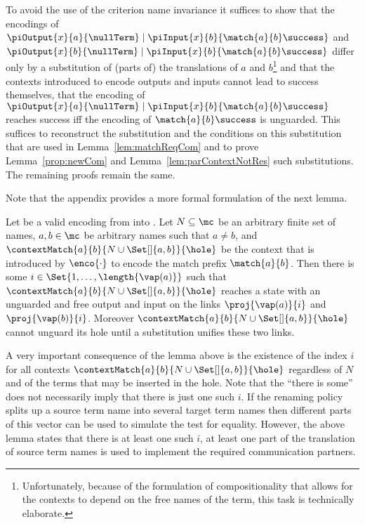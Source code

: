 \documentclass[final,copyright,creativecommons]{eptcs}
\begin{document}
To avoid the use of the criterion name invariance it suffices to show that the encodings of $ \piOutput{x}{a}{\nullTerm} \mid \piInput{x}{b}{\match{a}{b}\success} $ and $ \piOutput{x}{b}{\nullTerm} \mid \piInput{x}{b}{\match{a}{b}\success} $ differ only by a substitution of (parts of) the translations of $ a $ and $ b $\footnote{Unfortunately, because of the formulation of compositionality that allows for the contexts to depend on the free names of the term, this task is technically elaborate.} and that the contexts introduced to encode outputs and inputs cannot lead to success themselves, \ie that the encoding of $ \piOutput{x}{a}{\nullTerm} \mid \piInput{x}{b}{\match{a}{b}\success} $ reaches success iff the encoding of $ \match{a}{b}\success $ is unguarded. This suffices to reconstruct the substitution and the conditions on this substitution that are used in Lemma~\ref{lem:matchReqCom} and to prove Lemma~\ref{prop:newCom} and Lemma~\ref{lem:parContextNotRes} \wrt such substitutions. The remaining proofs remain the same.

Note that the appendix provides a more formal formulation of the next lemma.

\begin{lemma}
	\label{lem:matchReqCom}
	Let \encod be a valid encoding from \piT into \piNM.
	Let $ N \subseteq \mc $ be an arbitrary finite set of names,
	$ a, b \in \mc $ be arbitrary names such that $ a \neq b $,
	and $ \contextMatch{a}{b}{N \cup \Set[]{ a, b }}{\hole} $ be the context that is introduced by $ \enco{\cdot} $ to encode the match prefix $ \match{a}{b} $.
	Then there is some $ i \in \Set{ 1, \ldots, \length{\vap\!\left( a \right)} } $ such that $ \contextMatch{a}{b}{N \cup \Set[]{ a, b }}{\hole} $ reaches a state with an unguarded and free output and input on the links $ \proj{\vap\!\left( a \right)}{i} $ and $ \proj{\vap\!\left( b \right)}{i} $. Moreover $ \contextMatch{a}{b}{N \cup \Set[]{ a, b }}{\hole} $ cannot unguard its hole until a substitution unifies these two links.
\end{lemma}

\noindent
A very important consequence of the lemma above is the existence of the index $ i $ for all contexts $ \contextMatch{a}{b}{N \cup \Set[]{ a, b }}{\hole} $ regardless of $ N $ and of the terms that may be inserted in the hole. Note that the ``there is some'' does not necessarily imply that there is just one such $ i $. If the renaming policy splits up a source term name into several target term names then different parts of this vector can be used to simulate the test for equality. However, the above lemma states that there is at least one such $ i $, \ie at least one part of the translation of source term names is used to implement the required communication partners.
\end{document}
